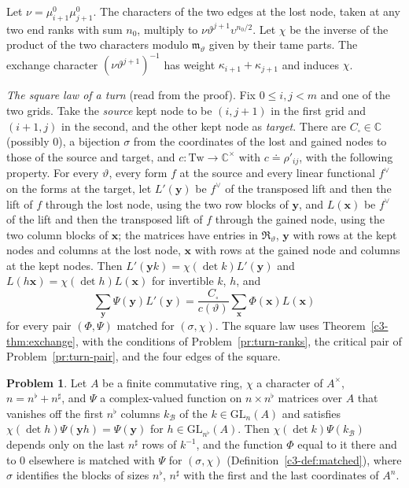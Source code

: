 \documentclass[reqno]{amsart}
\theoremstyle{definition}
\newtheorem{problem}{Problem}[section]
\theoremstyle{plain}
\newcommand{\C}{\mathbb C}
\newcommand{\GL}{\mathrm{GL}}
\newcommand{\Tw}{\mathrm{Tw}}
\newcommand{\Rm}{\mathfrak R}
\newcommand{\ns}{n^\sharp}
\newcommand{\nb}{n^\flat}
\begin{document}
Let \(\nu = \mu^0_{i+1}\mu^0_{j+1}\).  The characters of the two edges at the lost node, taken at any two end ranks with sum \(n_0\), multiply to \(\nu\vartheta^{j+1}\upsilon^{n_0/2}\).  Let \(\chi\) be the inverse of the product of the two characters modulo \(\mathfrak m_\vartheta\) given by their tame parts.  The exchange character \((\nu\vartheta^{j+1})^{-1}\) has weight \(\kappa_{i+1} + \kappa_{j+1}\) and induces \(\chi\).

\emph{The square law of a turn} (read from the proof).  Fix \(0 \le i, j < m\) and one of the two grids.  Take the \emph{source} kept node to be \((i, j+1)\) in the first grid and \((i+1, j)\) in the second, and the other kept node as \emph{target}.  There are \(C_\square \in \C\) (possibly \(0\)), a bijection \(\sigma\) from the coordinates of the lost and gained nodes to those of the source and target, and \(c\colon\Tw\to\C^\times\) with \(c \doteq \rho'_{ij}\), with the following property.  For every \(\vartheta\), every form \(f\) at the source and every linear functional \(f^\vee\) on the forms at the target, let \(L'(\mathbf y)\) be \(f^\vee\) of the transposed lift and then the lift of \(f\) through the lost node, using the two row blocks of \(\mathbf y\), and \(L(\mathbf x)\) be \(f^\vee\) of the lift and then the transposed lift of \(f\) through the gained node, using the two column blocks of \(\mathbf x\); the matrices have entries in \(\Rm_\vartheta\), \(\mathbf y\) with rows at the kept nodes and columns at the lost node, \(\mathbf x\) with rows at the gained node and columns at the kept nodes.  Then \(L'(\mathbf y k) = \chi(\det k)L'(\mathbf y)\) and \(L(h\mathbf x) = \chi(\det h)L(\mathbf x)\) for invertible \(k\), \(h\), and
\[
  \sum_{\mathbf y} \Psi(\mathbf y)L'(\mathbf y) = \frac{C_\square}{c(\vartheta)}\sum_{\mathbf x} \Phi(\mathbf x)L(\mathbf x)
\]
for every pair \((\Phi, \Psi)\) matched for \((\sigma, \chi)\).  The square law uses Theorem~\ref{c3-thm:exchange}, with the conditions of Problem~\ref{pr:turn-ranks}, the critical pair of Problem~\ref{pr:turn-pair}, and the four edges of the square.

\begin{problem}\label{pr:completion}
Let \(A\) be a finite commutative ring, \(\chi\) a character of \(A^\times\), \(n = \nb + \ns\), and \(\Psi\) a complex-valued function on \(n \times \nb\) matrices over \(A\) that vanishes off the first \(\nb\) columns \(k_{\mathcal B}\) of the \(k \in \GL_n(A)\) and satisfies \(\chi(\det h)\Psi(\mathbf y h) = \Psi(\mathbf y)\) for \(h \in \GL_{\nb}(A)\).  Then \(\chi(\det k)\Psi(k_{\mathcal B})\) depends only on the last \(\ns\) rows of \(k^{-1}\), and the function \(\Phi\) equal to it there and to \(0\) elsewhere is matched with \(\Psi\) for \((\sigma, \chi)\) (Definition~\ref{c3-def:matched}), where \(\sigma\) identifies the blocks of sizes \(\nb\), \(\ns\) with the first and the last coordinates of \(A^n\).
\end{problem}
\end{document}

